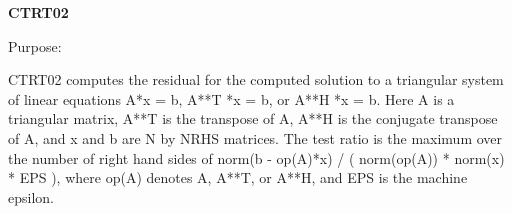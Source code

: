 {\bfseries C\+T\+R\+T02} 

\begin{DoxyParagraph}{Purpose\+: }
\begin{DoxyVerb} CTRT02 computes the residual for the computed solution to a
 triangular system of linear equations  A*x = b,  A**T *x = b,
 or A**H *x = b.  Here A is a triangular matrix, A**T is the transpose
 of A, A**H is the conjugate transpose of A, and x and b are N by NRHS
 matrices.  The test ratio is the maximum over the number of right
 hand sides of
    norm(b - op(A)*x) / ( norm(op(A)) * norm(x) * EPS ),
 where op(A) denotes A, A**T, or A**H, and EPS is the machine epsilon.\end{DoxyVerb}
 
\end{DoxyParagraph}

